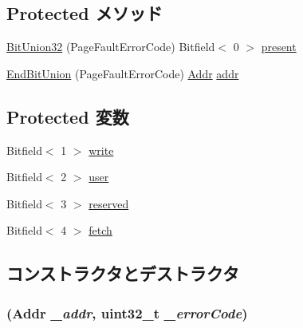 \subsection*{Protected メソッド}
\begin{DoxyCompactItemize}
\item 
\hyperlink{classX86ISA_1_1PageFault_a8b746ff214278bd3ab8d35330ebbbf71}{BitUnion32} (PageFaultErrorCode) Bitfield$<$ 0 $>$ \hyperlink{namespaceX86ISA_a2c4bc7438a48bd4bbdd7ed9b629a6ec6}{present}
\item 
\hyperlink{classX86ISA_1_1PageFault_a02b72810071333f2a5f8d3ea7538add6}{EndBitUnion} (PageFaultErrorCode) \hyperlink{base_2types_8hh_af1bb03d6a4ee096394a6749f0a169232}{Addr} \hyperlink{namespaceX86ISA_ab705917f60c5566f9ce56a93f798b2e2}{addr}
\end{DoxyCompactItemize}
\subsection*{Protected 変数}
\begin{DoxyCompactItemize}
\item 
Bitfield$<$ 1 $>$ \hyperlink{classX86ISA_1_1PageFault_afbbfc21831d777494ed9d797bd9870a1}{write}
\item 
Bitfield$<$ 2 $>$ \hyperlink{classX86ISA_1_1PageFault_adc1042328d36e83e5c72a380f2c97697}{user}
\item 
Bitfield$<$ 3 $>$ \hyperlink{classX86ISA_1_1PageFault_a5858891cfed455f1cea3c680b8adefad}{reserved}
\item 
Bitfield$<$ 4 $>$ \hyperlink{classX86ISA_1_1PageFault_adc843c49c832b796abd2f483d4fd45cc}{fetch}
\end{DoxyCompactItemize}


\subsection{コンストラクタとデストラクタ}
\hypertarget{classX86ISA_1_1PageFault_abf9b5f62d8dedad4159f6f999492af6e}{
\subsubsection[{PageFault}]{ ({\bf Addr} {\em \_\-addr}, \/  {\bf uint32\_\-t} {\em \_\-errorCode})}}
\label{classX86ISA_1_1PageFault_abf9b5f62d8dedad4159f6f999492af6e}



